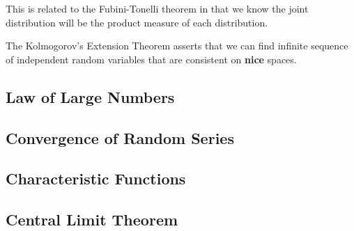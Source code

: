 This is related to the Fubini-Tonelli theorem in that we know the joint distribution will be the product measure of each distribution.

The Kolmogorov's Extension Theorem asserts that we can find infinite sequence of independent random variables that are consistent on \textbf{nice} spaces. 


\subsection{Law of Large Numbers}

\subsection{Convergence of Random Series}

\subsection{Characteristic Functions}

\subsection{Central Limit Theorem}